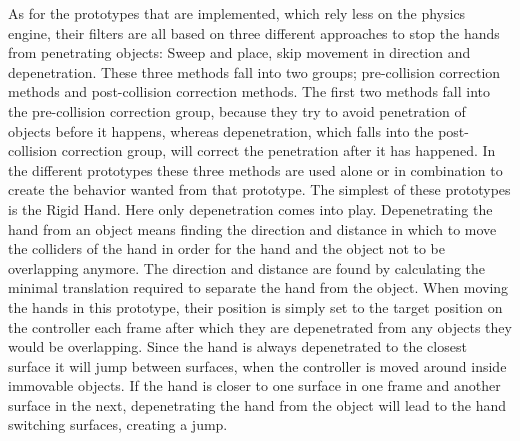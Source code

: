 As for the prototypes that are implemented, which rely less on the physics engine, their filters are all based on three different approaches to stop the hands from penetrating objects: Sweep and place, skip movement in direction and depenetration. These three methods fall into two groups; pre-collision correction methods and post-collision correction methods. The first two methods fall into the pre-collision correction group, because they try to avoid penetration of objects before it happens, whereas depenetration, which falls into the post-collision correction group, will correct the penetration after it has happened. In the different prototypes these three methods are used alone or in combination to create the behavior wanted from that prototype. The simplest of these prototypes is the Rigid Hand. Here only depenetration comes into play. Depenetrating the hand from an object means finding the direction and distance in which to move the colliders of the hand in order for the hand and the object not to be overlapping anymore. The direction and distance are found by calculating the minimal translation required to separate the hand from the object. When moving the hands in this prototype, their position is simply set to the target position on the controller each frame after which they are depenetrated from any objects they would be overlapping. Since the hand is always depenetrated to the closest surface it will jump between surfaces, when the controller is moved around inside immovable objects. If the hand is closer to one surface in one frame and another surface in the next, depenetrating the hand from the object will lead to the hand switching surfaces, creating a jump.

